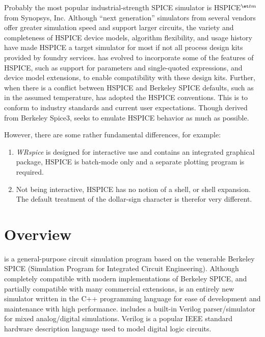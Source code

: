 
Probably the most popular industrial-strength SPICE simulator is
HSPICE$^{\et tm}$ from Synopsys, Inc.  Although ``next generation''
simulators from several vendors offer greater simulation speed and
support larger circuits, the variety and completeness of HSPICE device
models, algorithm flexibility, and usage history have made HSPICE a
target simulator for most if not all process design kits provided by
foundry services.  {\WRspice} has evolved to incorporate some of the
features of HSPICE, such as support for parameters and single-quoted
expressions, and device model extensions, to enable compatibility with
these design kits.  Further, when there is a conflict between HSPICE
and Berkeley SPICE defaults, such as in the assumed temperature,
{\WRspice} has adopted the HSPICE conventions.  This is to conform to
industry standards and current user expectations.  Though derived from
Berkeley Spice3, {\WRspice} seeks to emulate HSPICE behavior as much
as possible.

However, there are some rather fundamental differences, for example:
\begin{enumerate}
\item {\it WRspice} is designed for interactive use and contains an
integrated graphical package, HSPICE is batch-mode only and a separate
plotting program is required.

\item Not being interactive, HSPICE has no notion of a shell, or
shell expansion.  The default treatment of the dollar-sign
character is therefor very different.
\end{enumerate}


\section{{\WRspice} Overview}


{\WRspice} is a general-purpose circuit simulation program based on the
venerable Berkeley SPICE (Simulation Program for Integrated Circuit
Engineering).  Although completely compatible with modern
implementations of Berkeley SPICE, and partially compatible with many
commercial extensions, {\WRspice} is an entirely new simulator written
in the C++ programming language for ease of development and
maintenance with high performance.  {\WRspice} includes a built-in
Verilog parser/simulator for mixed analog/digital simulations.
Verilog is a popular IEEE standard hardware description language used
to model digital logic circuits.

